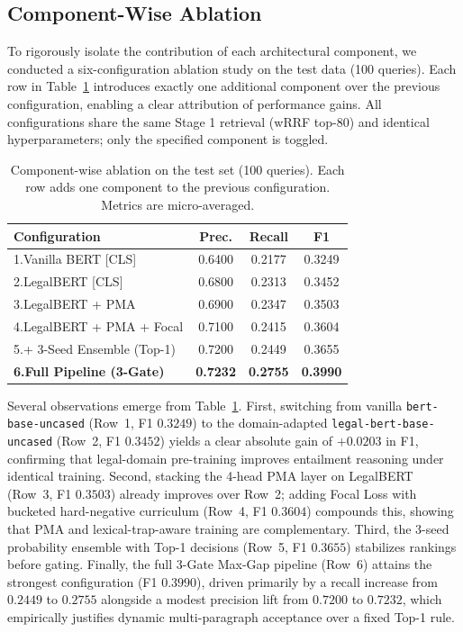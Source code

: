 \documentclass[sigconf]{acmart}
\newcommand{\rev}[1]{{\color{blue}#1}}
\begin{document}
\rev{\subsection{Component-Wise Ablation}

To rigorously isolate the contribution of each architectural component, we conducted a six-configuration ablation study on the test data (100 queries). Each row in Table~\ref{tab:component_ablation} introduces exactly one additional component over the previous configuration, enabling a clear attribution of performance gains. All configurations share the same Stage 1 retrieval (wRRF top-80) and identical hyperparameters; only the specified component is toggled.

\begin{table}[h]
  \caption{Component-wise ablation on the test set (100 queries). Each row adds one component to the previous configuration. Metrics are micro-averaged.}
  \label{tab:component_ablation}
  \begin{tabular}{@{}l c c c@{}}
    \toprule
    \textbf{Configuration} & \textbf{Prec.} & \textbf{Recall} & \textbf{F1} \\
    \midrule
    1.\;Vanilla BERT [CLS] & 0.6400 & 0.2177 & 0.3249 \\
    2.\;LegalBERT [CLS] & 0.6800 & 0.2313 & 0.3452 \\
    3.\;LegalBERT + PMA & 0.6900 & 0.2347 & 0.3503 \\
    4.\;LegalBERT + PMA + Focal & 0.7100 & 0.2415 & 0.3604 \\
    5.\;+ 3-Seed Ensemble (Top-1) & 0.7200 & 0.2449 & 0.3655 \\
    \textbf{6.\;Full Pipeline (3-Gate)} & \textbf{0.7232} & \textbf{0.2755} & \textbf{0.3990} \\
    \bottomrule
  \end{tabular}
\end{table}

Several observations emerge from Table~\ref{tab:component_ablation}. First, switching from vanilla \texttt{bert-base-uncased} (Row~1, F1 $0.3249$) to the domain-adapted \texttt{legal-bert-base-uncased} (Row~2, F1 $0.3452$) yields a clear absolute gain of $+0.0203$ in F1, confirming that legal-domain pre-training improves entailment reasoning under identical training. Second, stacking the 4-head PMA layer on LegalBERT (Row~3, F1 $0.3503$) already improves over Row~2; adding Focal Loss with bucketed hard-negative curriculum (Row~4, F1 $0.3604$) compounds this, showing that PMA and lexical-trap-aware training are complementary. Third, the 3-seed probability ensemble with Top-1 decisions (Row~5, F1 $0.3655$) stabilizes rankings before gating. Finally, the full 3-Gate Max-Gap pipeline (Row~6) attains the strongest configuration (F1 $0.3990$), driven primarily by a recall increase from $0.2449$ to $0.2755$ alongside a modest precision lift from $0.7200$ to $0.7232$, which empirically justifies dynamic multi-paragraph acceptance over a fixed Top-1 rule.}
\end{document}
